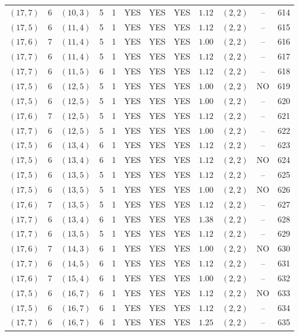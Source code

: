 \begin{longtable}{|c|c|c|c|c|c|c|c|c|c|c|c|}
$(17,7)$ & 6 & $(10,3)$ & 5 & 1 & YES & YES & YES & $1.12$ & $(2,2)$ & -- & 614\\
$(17,5)$ & 6 & $(11,4)$ & 5 & 1 & YES & YES & YES & $1.12$ & $(2,2)$ & -- & 615\\
$(17,6)$ & 7 & $(11,4)$ & 5 & 1 & YES & YES & YES & $1.00$ & $(2,2)$ & -- & 616\\
$(17,7)$ & 6 & $(11,4)$ & 5 & 1 & YES & YES & YES & $1.12$ & $(2,2)$ & -- & 617\\
$(17,7)$ & 6 & $(11,5)$ & 6 & 1 & YES & YES & YES & $1.12$ & $(2,2)$ & -- & 618\\
$(17,5)$ & 6 & $(12,5)$ & 5 & 1 & YES & YES & YES & $1.00$ & $(2,2)$ & NO & 619\\
$(17,5)$ & 6 & $(12,5)$ & 5 & 1 & YES & YES & YES & $1.00$ & $(2,2)$ & -- & 620\\
$(17,6)$ & 7 & $(12,5)$ & 5 & 1 & YES & YES & YES & $1.12$ & $(2,2)$ & -- & 621\\
$(17,7)$ & 6 & $(12,5)$ & 5 & 1 & YES & YES & YES & $1.00$ & $(2,2)$ & -- & 622\\
$(17,5)$ & 6 & $(13,4)$ & 6 & 1 & YES & YES & YES & $1.12$ & $(2,2)$ & -- & 623\\
$(17,5)$ & 6 & $(13,4)$ & 6 & 1 & YES & YES & YES & $1.12$ & $(2,2)$ & NO & 624\\
$(17,5)$ & 6 & $(13,5)$ & 5 & 1 & YES & YES & YES & $1.12$ & $(2,2)$ & -- & 625\\
$(17,5)$ & 6 & $(13,5)$ & 5 & 1 & YES & YES & YES & $1.00$ & $(2,2)$ & NO & 626\\
$(17,6)$ & 7 & $(13,5)$ & 5 & 1 & YES & YES & YES & $1.12$ & $(2,2)$ & -- & 627\\
$(17,7)$ & 6 & $(13,4)$ & 6 & 1 & YES & YES & YES & $1.38$ & $(2,2)$ & -- & 628\\
$(17,7)$ & 6 & $(13,5)$ & 5 & 1 & YES & YES & YES & $1.12$ & $(2,2)$ & -- & 629\\
$(17,6)$ & 7 & $(14,3)$ & 6 & 1 & YES & YES & YES & $1.00$ & $(2,2)$ & NO & 630\\
$(17,7)$ & 6 & $(14,5)$ & 6 & 1 & YES & YES & YES & $1.12$ & $(2,2)$ & -- & 631\\
$(17,6)$ & 7 & $(15,4)$ & 6 & 1 & YES & YES & YES & $1.00$ & $(2,2)$ & -- & 632\\
$(17,5)$ & 6 & $(16,7)$ & 6 & 1 & YES & YES & YES & $1.12$ & $(2,2)$ & NO & 633\\
$(17,5)$ & 6 & $(16,7)$ & 6 & 1 & YES & YES & YES & $1.12$ & $(2,2)$ & -- & 634\\
$(17,7)$ & 6 & $(16,7)$ & 6 & 1 & YES & YES & YES & $1.25$ & $(2,2)$ & -- & 635\\

\end{longtable}
